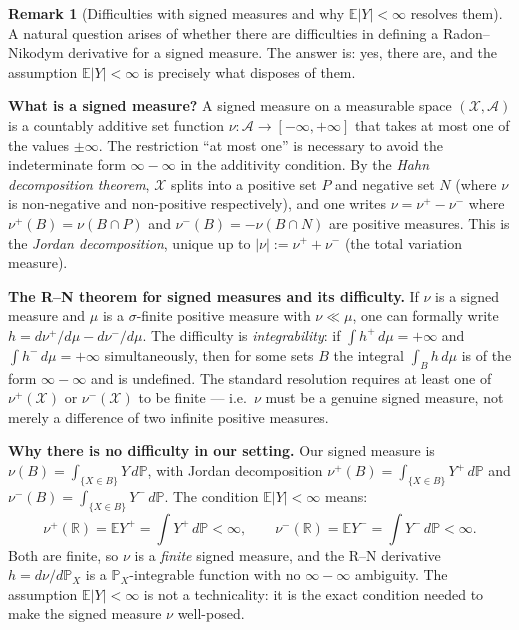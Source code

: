 \documentclass[12pt, a4paper]{article}
\theoremstyle{definition}
\newtheorem{remark}{Remark}[section]
\newcommand{\E}{\mathbb{E}}
\newcommand{\R}{\mathbb{R}}
\newcommand{\Prob}{\mathbb{P}}
\begin{document}
\begin{remark}[Difficulties with signed measures and why $\E|Y|<\infty$
  resolves them]\label{rem:signed}
A natural question arises of whether there are
difficulties in defining a Radon--Nikodym derivative for a signed
measure. The answer is: yes, there are, and the assumption
$\E|Y|<\infty$ is precisely what disposes of them.

\medskip
\textbf{What is a signed measure?}
A signed measure on a measurable space $(\mathcal{X},\mathcal{A})$
is a countably additive set function
$\nu:\mathcal{A}\to[-\infty,+\infty]$ that takes at most one of the
values $\pm\infty$.  The restriction ``at most one'' is necessary to
avoid the indeterminate form $\infty-\infty$ in the additivity
condition.  By the \emph{Hahn decomposition theorem}, $\mathcal{X}$
splits into a positive set $P$ and negative set $N$ (where $\nu$ is
non-negative and non-positive respectively), and one writes
$\nu=\nu^+-\nu^-$ where $\nu^+(B)=\nu(B\cap P)$ and
$\nu^-(B)=-\nu(B\cap N)$ are positive measures.
This is the \emph{Jordan decomposition}, unique up to
$|\nu|:=\nu^++\nu^-$ (the total variation measure).

\medskip
\textbf{The R--N theorem for signed measures and its difficulty.}
If $\nu$ is a signed measure and $\mu$ is a $\sigma$-finite positive
measure with $\nu\ll\mu$, one can formally write
$h=d\nu^+/d\mu - d\nu^-/d\mu$.  The difficulty is
\emph{integrability}: if $\int h^+\,d\mu=+\infty$ and
$\int h^-\,d\mu=+\infty$ simultaneously, then for some sets $B$ the
integral $\int_B h\,d\mu$ is of the form $\infty-\infty$ and is
undefined.  The standard resolution requires at least one of
$\nu^+(\mathcal{X})$ or $\nu^-(\mathcal{X})$ to be finite --- i.e.\
$\nu$ must be a genuine signed measure, not merely a difference of
two infinite positive measures.

\medskip
\textbf{Why there is no difficulty in our setting.}
Our signed measure is $\nu(B)=\int_{\{X\in B\}}Y\,d\Prob$, with
Jordan decomposition $\nu^+(B)=\int_{\{X\in B\}}Y^+\,d\Prob$ and
$\nu^-(B)=\int_{\{X\in B\}}Y^-\,d\Prob$.  The condition
$\E|Y|<\infty$ means:
\[
  \nu^+(\R)=\E Y^+=\int Y^+\,d\Prob<\infty,
  \qquad
  \nu^-(\R)=\E Y^-=\int Y^-\,d\Prob<\infty.
\]
Both are finite, so $\nu$ is a \emph{finite} signed measure, and the
R--N derivative $h=d\nu/d\Prob_X$ is a $\Prob_X$-integrable function
with no $\infty-\infty$ ambiguity.  The assumption $\E|Y|<\infty$ is
not a technicality: it is the exact condition needed to make the
signed measure $\nu$ well-posed.


\end{remark}
\end{document}
